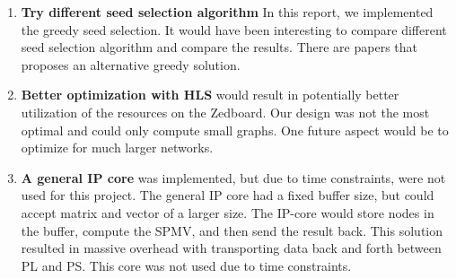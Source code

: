 \begin{enumerate}
\item \textbf{Try different seed selection algorithm} In this report, we implemented the greedy seed selection. It would have been interesting to compare different seed selection algorithm and compare the results. There are papers \citep{Chen:2009:EIM:1557019.1557047} that proposes an alternative greedy solution.  
\item \textbf{Better optimization with HLS} would result in potentially better utilization of the resources on the Zedboard. Our design was not the most optimal and could only compute small graphs. One future aspect would be to optimize for much larger networks.

\item \textbf{A general IP core} was implemented, but due to time constraints, were not used for this project. The general IP core had a fixed buffer size, but could accept matrix and vector of a larger size. The IP-core would store nodes in the buffer, compute the SPMV, and then send the result back. This solution resulted in massive overhead with transporting data back and forth between PL and PS. This core was not used due to time constraints.
\end{enumerate}


